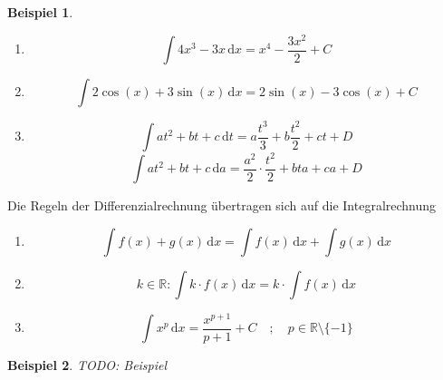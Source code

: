 \documentclass{report}
\newtheorem{myexample}{Beispiel}
\begin{document}
\begin{myexample}
\begin{enumerate}Wir berechnen die unbestimmten Integrale:
\item \begin{equation}\int \! 4x^3 - 3x \, \mathrm{d} x = x^4 - \frac{3x^2}{2} + C\end{equation}
\item \begin{equation}\int \! 2 \cos(x) + 3 \sin(x) \, \mathrm{d} x = 2 \sin(x) - 3\cos(x) + C\end{equation}
\item \begin{equation}\int \! at^2 + bt + c \, \mathrm{d} t = a \frac{t^3}{3} + b \frac{t^2}{2} + ct + D\end{equation}
\begin{equation}\int \! at^2 + bt + c \, \mathrm{d} a = \frac{a^2}{2} \cdot \frac{t^2}{2} + bta + ca + D\end{equation}
\end{enumerate}\end{myexample}
Die Regeln der Differenzialrechnung übertragen sich auf die Integralrechnung
\begin{enumerate}
\item \begin{equation}\int \! f(x) + g(x) \, \mathrm{d} x = \int \! f(x) \, \mathrm{d} x + \int \! g(x) \, \mathrm{d} x\end{equation}
\item \begin{equation}k \in \mathbb{R}: \int \! k \cdot f(x) \, \mathrm{d} x = k \cdot \int \! f(x) \, \mathrm{d} x\end{equation}
\item \begin{equation}\int \! x^p \, \mathrm{d} x = \frac{x^{p+1}}{p+1} + C\quad ; \quad p \in \mathbb{R} \setminus \{-1\}\end{equation}
\end{enumerate}
\begin{myexample}TODO: Beispiel\end{myexample}
\end{document}
